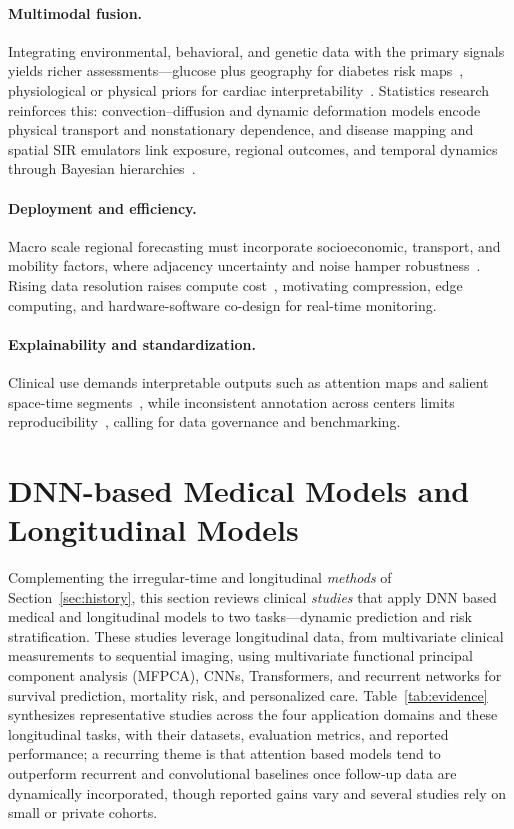 \documentclass[journal]{IEEEtran}
\begin{document}
\paragraph{Multimodal fusion.} Integrating environmental, behavioral, and genetic data with the primary signals yields richer assessments---glucose plus geography for diabetes risk maps~\cite{XiaoLi2016DiabetesSpatiotemporal}, physiological or physical priors for cardiac interpretability~\cite{5,7}. Statistics research reinforces this: convection--diffusion and dynamic deformation models encode physical transport and nonstationary dependence, and disease mapping and spatial SIR emulators link exposure, regional outcomes, and temporal dynamics through Bayesian hierarchies~\cite{liu2022convectionDiffusion,castroMorales2025dynamicDeformation,wang2024respiratoryDiseaseMapping,trostle2024spatialSIR,wikle2023statisticalDeepLearning}.

\paragraph{Deployment and efficiency.} Macro scale regional forecasting must incorporate socioeconomic, transport, and mobility factors, where adjacency uncertainty and noise hamper robustness~\cite{2,3}. Rising data resolution raises compute cost~\cite{5,7}, motivating compression, edge computing, and hardware-software co-design for real-time monitoring.

\paragraph{Explainability and standardization.} Clinical use demands interpretable outputs such as attention maps and salient space-time segments~\cite{2,4}, while inconsistent annotation across centers limits reproducibility~\cite{6}, calling for data governance and benchmarking.

\section{DNN-based Medical Models and Longitudinal Models}
\label{sec:categorization}
Complementing the irregular-time and longitudinal \emph{methods} of Section~\ref{sec:history}, this section reviews clinical \emph{studies} that apply DNN based medical and longitudinal models to two tasks---dynamic prediction and risk stratification. These studies leverage longitudinal data, from multivariate clinical measurements to sequential imaging, using multivariate functional principal component analysis (MFPCA), CNNs, Transformers, and recurrent networks for survival prediction, mortality risk, and personalized care. Table~\ref{tab:evidence} synthesizes representative studies across the four application domains and these longitudinal tasks, with their datasets, evaluation metrics, and reported performance; a recurring theme is that attention based models tend to outperform recurrent and convolutional baselines once follow-up data are dynamically incorporated, though reported gains vary and several studies rely on small or private cohorts.
\end{document}
